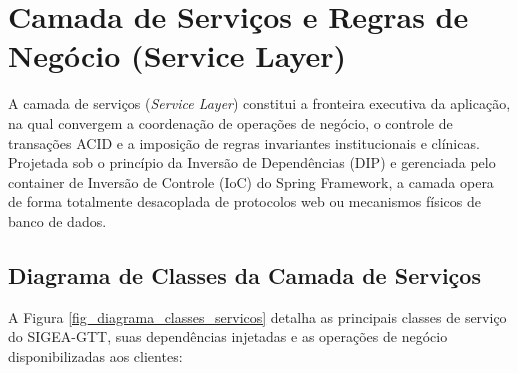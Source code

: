 \chapter{Camada de Serviços e Regras de Negócio (Service Layer)}
\label{cap_camada_servicos}

A camada de serviços (\textit{Service Layer}) constitui a fronteira executiva da aplicação, na qual convergem a coordenação de operações de negócio, o controle de transações ACID e a imposição de regras invariantes institucionais e clínicas. Projetada sob o princípio da Inversão de Dependências (DIP) e gerenciada pelo container de Inversão de Controle (IoC) do Spring Framework, a camada opera de forma totalmente desacoplada de protocolos web ou mecanismos físicos de banco de dados.

\section{Diagrama de Classes da Camada de Serviços}
\label{sec_diagrama_classes_servicos}

A Figura \ref{fig_diagrama_classes_servicos} detalha as principais classes de serviço do SIGEA-GTT, suas dependências injetadas e as operações de negócio disponibilizadas aos clientes:

